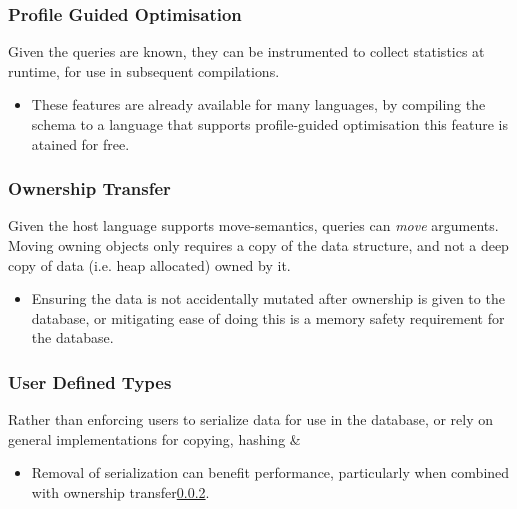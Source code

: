 \subsubsection{Profile Guided Optimisation}
Given the queries are known, they can be instrumented to collect statistics at runtime, for use in subsequent compilations.
\begin{itemize}
    \setlength\itemsep{0em}
    \item These features are already available for many languages, by compiling the schema to a language that supports profile-guided optimisation this feature is atained for free.
\end{itemize}

\subsubsection{Ownership Transfer}
\label{sec:ownership_transfer}
Given the host language supports move-semantics, queries can \textit{move} arguments. Moving owning objects only requires a copy of the data structure, and not a deep copy of data (i.e. heap allocated) owned by it.
\begin{itemize}
    \setlength\itemsep{0em}
    \item Ensuring the data is not accidentally mutated after ownership is given to the database, or mitigating ease of doing this is a memory safety requirement for the database.
\end{itemize}

\subsubsection{User Defined Types}
Rather than enforcing users to serialize data for use in the database, or rely on general implementations for copying, hashing \& 
\begin{itemize}
    \setlength\itemsep{0em}
    \item Removal of serialization can benefit performance, particularly when combined with ownership transfer\ref{sec:ownership_transfer}.
\end{itemize}